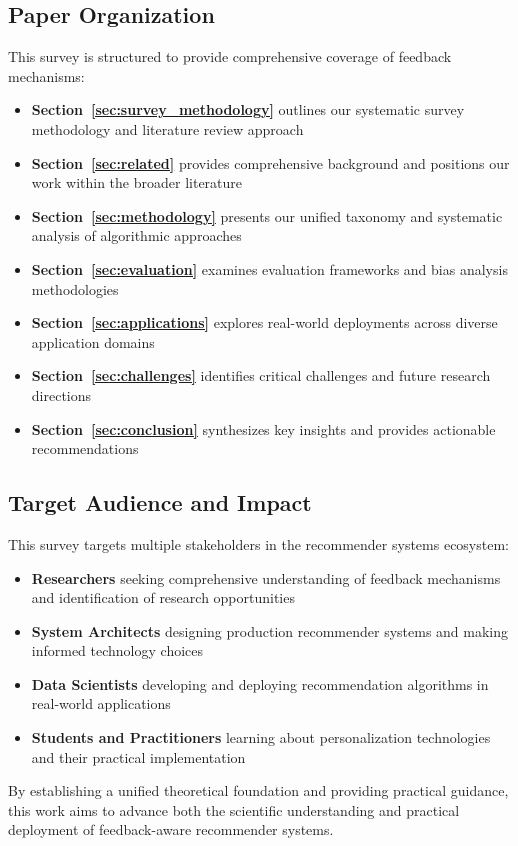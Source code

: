 \subsection{Paper Organization}

This survey is structured to provide comprehensive coverage of feedback mechanisms:

\begin{itemize}
    \item \textbf{Section~\ref{sec:survey_methodology}} outlines our systematic survey methodology and literature review approach
    \item \textbf{Section~\ref{sec:related}} provides comprehensive background and positions our work within the broader literature
    \item \textbf{Section~\ref{sec:methodology}} presents our unified taxonomy and systematic analysis of algorithmic approaches
    \item \textbf{Section~\ref{sec:evaluation}} examines evaluation frameworks and bias analysis methodologies
    \item \textbf{Section~\ref{sec:applications}} explores real-world deployments across diverse application domains
    \item \textbf{Section~\ref{sec:challenges}} identifies critical challenges and future research directions
    \item \textbf{Section~\ref{sec:conclusion}} synthesizes key insights and provides actionable recommendations
\end{itemize}

\subsection{Target Audience and Impact}

This survey targets multiple stakeholders in the recommender systems ecosystem:

\begin{itemize}
    \item \textbf{Researchers} seeking comprehensive understanding of feedback mechanisms and identification of research opportunities
    \item \textbf{System Architects} designing production recommender systems and making informed technology choices
    \item \textbf{Data Scientists} developing and deploying recommendation algorithms in real-world applications
    \item \textbf{Students and Practitioners} learning about personalization technologies and their practical implementation
\end{itemize}

By establishing a unified theoretical foundation and providing practical guidance, this work aims to advance both the scientific understanding and practical deployment of feedback-aware recommender systems.